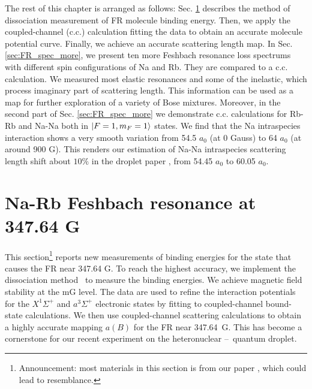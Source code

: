 The rest of this chapter is arranged as follows: Sec. \ref{sec:cali_FR} describes the method of dissociation measurement of FR molecule binding energy. Then, we apply the coupled-channel (c.c.) calculation fitting the data to obtain an accurate molecule potential curve. Finally, we achieve an accurate scattering length map. In Sec. \ref{sec:FR_spec_more}, we present ten more Feshbach resonance loss spectrums with different spin configurations of Na and Rb. They are compared to a c.c. calculation. We measured most elastic resonances and some of the inelastic, which process imaginary part of scattering length. This information can be used as a map for further exploration of a variety of Bose mixtures. Moreover, in the second part of Sec. \ref{sec:FR_spec_more} we demonstrate c.c. calculations for Rb-Rb and Na-Na both in $\ket{F=1,m_F=1}$ states. We find that the Na intraspecies interaction shows a very smooth variation from 54.5 $a_0$ (at 0 Gauss) to 64 $a_0$ (at around 900 G). This renders our estimation of Na-Na intraspecies scattering length shift about $10\%$ in the droplet paper \cite{guo2021leehuangyang}, from 54.45 $a_0$ to 60.05 $a_0$.

\section{Na-Rb Feshbach resonance at 347.64 G}
\label{sec:cali_FR}

This section\footnote{Announcement: most materials in this section is from our paper \cite{guo2021tunable}, which could lead to resemblance.} reports new measurements of binding energies for the state that causes the FR near 347.64 G. To reach the highest accuracy, we implement the dissociation method~\cite{Bartenstein2005,Zurn2013,Chin2005radio,Chapurin2019} to measure the binding energies. We achieve magnetic field stability at the mG level. The data are used to refine the interaction potentials for the $X^1\Sigma^+$ and $a^3\Sigma^+$ electronic states by fitting to coupled-channel bound-state calculations. We then use coupled-channel scattering calculations to obtain a highly accurate mapping $a(B)$ for the FR near 347.64~G. This has become a cornerstone for our recent experiment on the heteronuclear \Na--\Rb~quantum droplet\cite{guo2021leehuangyang}. 

